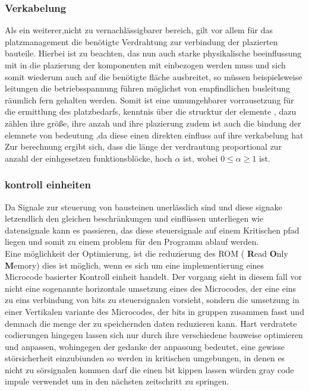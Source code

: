 \documentclass[conference]{IEEEtran}
\begin{document}
 \subsubsection{Verkabelung}
 Als ein weiterer,nicht zu vernachlässigbarer bereich, gilt vor allem für das platzmanagement die benötigte Verdrahtung zur verbindung der plazierten bauteile. Hierbei ist zu beachten, das nun auch starke physikalische beeinflussung mit in die plazierung der komponenten mit einbezogen werden muss und sich somit wiederum auch auf die benötigte fläche ausbreitet, so müssen beispielsweise leitungen die betriebsspannung führen möglichst von empfindlichen busleitung räumlich fern gehalten werden.
Somit ist eine umumgehbarer vorrausetzung für die ermittlung des platzbedarfs, kenntnis über die strucktur der elemente , dazu zählen ihre größe, ihre anzah und ihre plazierung zudem ist auch die bindung der elemnete von bedeutung ,da diese einen direkten einfluss auf ihre verkabelung hat \cite[S.157]{3}
Zur berechnung ergibt sich, dass die länge der verdrautung proportional zur anzahl der einhgesetzen funktionsblöcke, hoch $\alpha$ ist, wobei $0 \leq \alpha \geq 1$ ist.\cite[S.157]{3}
 \subsubsection{kontroll einheiten}
 Da Signale zur steuerung von bausteinen unerlässlich sind und diese signake letzendlich den gleichen beschränkungen und einflüssen unterliegen wie datensignale kann es passieren, das diese steuersignale auf einem Kritischen pfad liegen und somit zu einem problem für den Programm ablauf werden.\\
 Eine möglichkeit der Optimierung, ist die reduzierung des ROM ( \textbf{R}ead \textbf{O}nly \textbf{M}emory)
dies ist möglich, wenn es sich um eine implementierung eines Microcode basierter Kontroll einheit handelt. Der vorgang sieht in diesem fall vor nicht eine sogenannte horizontale umsetzung eines des Microcodes, der eine eins zu eins verbindung von bits zu steuersignalen vorsieht, sondern die umsetzung in einer Vertikalen variante des Microcodes, der bits in gruppen zusammen fasst und demnach die menge der zu speichernden daten reduzieren kann.
\cite[S.371-372]{2}
Hart verdratete codierungen hingegen lassen sich nur durch ihre verschiedene bauweise optimieren und anpassen, wohingegen der gedanke der anpassung bedeutet, eine gewisse störsicherheit einzubiunden so werden in kritischen umgebungen, in denen es nicht zu sörsignalen kommen darf die einen bit kippen lassen würden gray code impule verwendet um in den nächsten zeitschritt zu springen.\cite[S.373]{2}
\end{document}
